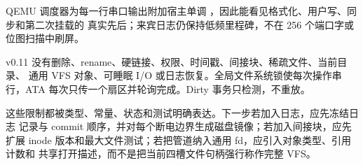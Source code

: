 QEMU 调度器为每一行串口输出附加宿主单调
\code{[QEMU][T+xxxxxxms]}，因此能看见格式化、用户写、同步和第二次挂载的
真实先后；来宾日志仍保持低频里程碑，不在 256 个端口字或位图扫描中刷屏。

v0.11 没有删除、rename、硬链接、权限、时间戳、间接块、稀疏文件、当前目录、
通用 VFS 对象、可睡眠 I/O 或日志恢复。全局文件系统锁使每次操作串行，ATA
每次只传一个扇区并轮询完成。Dirty 事务只检测，不重放。

这些限制都被类型、常量、状态和测试明确表达。下一步若加入日志，应先冻结日志
记录与 commit 顺序，并对每个断电边界生成磁盘镜像；若加入间接块，应先扩展
inode 版本和最大文件测试；若把管道纳入通用 fd，应引入对象类型、引用计数和
共享打开描述，而不是把当前四槽文件句柄强行称作完整 VFS。
